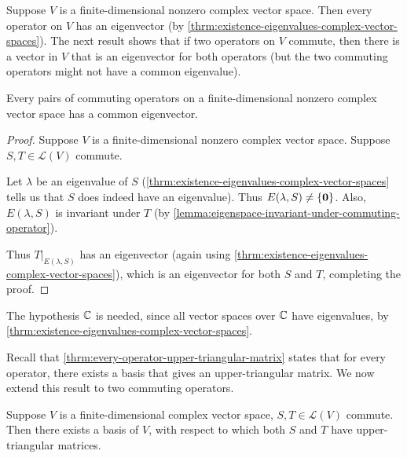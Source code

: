 Suppose $V$ is a finite-dimensional nonzero complex vector space. Then every operator on $V$ has an eigenvector (by \ref{thrm:existence-eigenvalues-complex-vector-spaces}). 
The next result shows that if two operators on $V$ commute, then there is a vector in $V$ that is an eigenvector for both operators (but the two commuting operators might not have a common eigenvalue).

\begin{lemma}\label{lemma:commuting-operators-common-eigenvalue}
Every pairs of commuting operators on a finite-dimensional nonzero complex vector space has a common eigenvector.
\end{lemma}

\begin{proof}
Suppose $V$ is a finite-dimensional nonzero complex vector space. Suppose $S,T\in\mathcal{L}(V)$ commute.

Let $\lambda$ be an eigenvalue of $S$ (\ref{thrm:existence-eigenvalues-complex-vector-spaces} tells us that $S$ does indeed have an eigenvalue). Thus $E(\lambda,S)\neq\{\vb{0}\}$. Also, $E(\lambda,S)$ is invariant under $T$ (by \ref{lemma:eigenspace-invariant-under-commuting-operator}).

Thus $T|_{E(\lambda,S)}$ has an eigenvector (again using \ref{thrm:existence-eigenvalues-complex-vector-spaces}), which is an eigenvector for both $S$ and $T$, completing the proof.
\end{proof}

\begin{remark}
The hypothesis $\mathbb C$ is needed, since all vector spaces over $\mathbb C$ have eigenvalues, by \ref{thrm:existence-eigenvalues-complex-vector-spaces}.
\end{remark}

Recall that \ref{thrm:every-operator-upper-triangular-matrix} states that for every operator, there exists a basis that gives an upper-triangular matrix. We now extend this result to two commuting operators.

\begin{proposition}\label{prop:commuting-operators-simultaneous-upper-triangular}
Suppose $V$ is a finite-dimensional complex vector space, $S,T\in\mathcal{L}(V)$ commute. Then there exists a basis of $V$, with respect to which both $S$ and $T$ have upper-triangular matrices.
\end{proposition}

